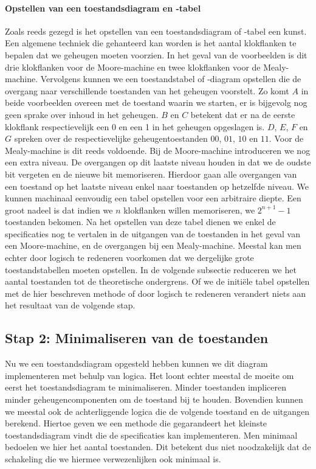 \paragraph{Opstellen van een toestandsdiagram en -tabel}Zoals reeds gezegd is het opstellen van een toestandsdiagram of -tabel een kunst. Een algemene techniek die gehanteerd kan worden is het aantal klokflanken te bepalen dat we geheugen moeten voorzien.  In het geval van de voorbeelden is dit drie klokflanken voor de Moore-machine en twee klokflanken voor de Mealy-machine. Vervolgens kunnen we een toestandstabel of -diagram opstellen die de overgang naar verschillende toestanden van het geheugen voorstelt. Zo komt $A$ in beide voorbeelden overeen met de toestand waarin we starten, er is bijgevolg nog geen sprake over inhoud in het geheugen. $B$ en $C$ betekent dat er na de eerste klokflank respectievelijk een 0 en een 1 in het geheugen opgeslagen is. $D$, $E$, $F$ en $G$ spreken over de respectievelijke geheugentoestanden $00$, $01$, $10$ en $11$. Voor de Mealy-machine is dit reeds voldoende. Bij de Moore-machine introduceren we nog een extra niveau. De overgangen op dit laatste niveau houden in dat we de oudste bit vergeten en de nieuwe bit memoriseren. Hierdoor gaan alle overgangen van een toestand op het laatste niveau enkel naar toestanden op hetzelfde niveau. We kunnen machinaal eenvoudig een tabel opstellen voor een arbitraire diepte. Een groot nadeel is dat indien we $n$ klokflanken willen memoriseren, we $2^{n+1}-1$ toestanden bekomen. Na het opstellen van deze tabel dienen we enkel de specificaties nog te vertalen in de uitgangen van de toestanden in het geval van een Moore-machine, en de overgangen bij een Mealy-machine. Meestal kan men echter door logisch te redeneren voorkomen dat we dergelijke grote toestandstabellen moeten opstellen. In de volgende subsectie reduceren we het aantal toestanden tot de theoretische ondergrens. Of we de initi\"ele tabel opstellen met de hier beschreven methode of door logisch te redeneren verandert niets aan het resultaat van de volgende stap.
\subsection{Stap 2: Minimaliseren van de toestanden}
\label{ss:minimizeFSMSeq}
Nu we een toestandsdiagram opgesteld hebben kunnen we dit diagram implementeren met behulp van logica. Het loont echter meestal de moeite om eerst het toestandsdiagram te minimaliseren. Minder toestanden impliceren minder geheugencomponenten om de toestand bij te houden. Bovendien kunnen we meestal ook de achterliggende logica die de volgende toestand en de uitgangen berekend. Hiertoe geven we een methode die gegarandeert het kleinste toestandsdiagram vindt die de specificaties kan implementeren. Men minimaal bedoelen we hier het aantal toestanden. Dit betekent dus niet noodzakelijk dat de schakeling die we hiermee verwezenlijken ook minimaal is.

